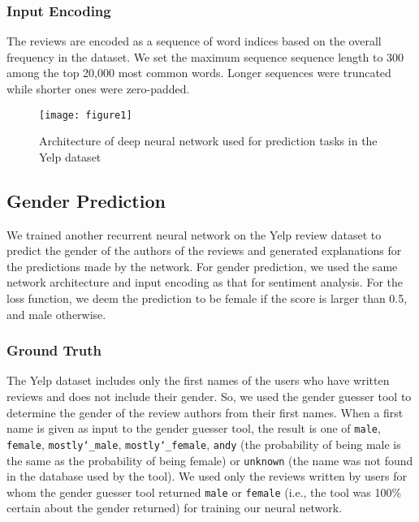 \subsubsection{Input Encoding}

The reviews are encoded as a sequence of word indices based on the overall frequency in the dataset. We set the maximum sequence sequence length to 300 among the top 20,000 most common words. Longer sequences were truncated while shorter ones were zero-padded.

\begin{figure*}[t]
	\texttt{[image: figure1]}
	\caption{Architecture of deep neural network used for prediction tasks in the Yelp dataset}
	\label{fig:dnn-arch}
\end{figure*}

\subsection{Gender Prediction}
\label{subsection:gp}

We trained another recurrent neural network on the Yelp review dataset to predict the gender of the authors of the reviews and generated explanations for the predictions made by the network. For gender prediction, we used the same network architecture and input encoding as that for sentiment analysis. For the loss function, we deem the prediction to be female if the score is larger than 0.5, and male otherwise. 

\subsubsection{Ground Truth}

The Yelp dataset includes only the first names of the users who have written reviews and does not include their gender. So, we used the gender guesser tool \cite{GenderGuesser2017} to determine the gender of the review authors from their first names. When a first name is given as input to the gender guesser tool, the result is one of \texttt{male}, \texttt{female}, \texttt{mostly\char`_male}, \texttt{mostly\char`_female}, \texttt{andy} (the probability of being male is the same as the probability of being female) or \texttt{unknown} (the name was not found in the database used by the tool). We used only the reviews written by users for whom the gender guesser tool returned \texttt{male} or \texttt{female} (i.e., the tool was 100\% certain about the gender returned) for training our neural network.

